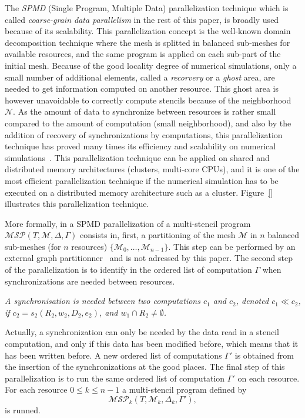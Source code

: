 The \textit{SPMD} (Single Program, Multiple Data) parallelization technique which is called \textit{coarse-grain data parallelism} in the rest of this paper, is broadly used because of its scalability. This parallelization concept is the well-known domain decomposition technique where the mesh is splitted in balanced sub-meshes for available resources, and the same program is applied on each sub-part of the initial mesh. Because of the good locality degree of numerical simulations, only a small number of additional elements, called a \textit{recorvery} or a \textit{ghost} area, are needed to get information computed on another resource. This ghost area is however unavoidable to correctly compute stencils because of the neighborhood $\mathcal{N}$. As the amount of data to synchronize between resources is rather small compared to the amount of computation (small neighborhood), and also by the addition of recovery of synchronizations by computations, this parallelization technique has proved many times its efficiency and scalability on numerical simulations~\cite{}. This parallelization technique can be applied on shared and distributed memory architectures (clusters, multi-core CPUs), and it is one of the most efficient parallelization technique if the numerical simulation has to be executed on a distributed memory architecture such as a cluster. Figure~\ref{} illustrates this parallelization technique.

More formally, in a SPMD parallelization of a multi-stencil program $\mathcal{MSP}(T,\mathcal{M},\Delta,\Gamma)$ consists in, first, a partitioning of the mesh $\mathcal{M}$ in $n$ balanced sub-meshes (for $n$ resources) $\{\mathcal{M}_0,\dots,\mathcal{M}_{n-1}\}$. This step can be performed by an external graph partitionner~\cite{} and is not adressed by this paper. The second step of the parallelization is to identify in the ordered list of computation $\Gamma$ when synchronizations are needed between resources.

\medskip
\begin{mydef}
\textit{A \textit{synchronisation} is needed between two computations $c_1$ and $c_2$, denoted $c_1 \ll c_2$, if $c_2=s_2(R_2,w_2,D_2,e_2)$, and $w_1 \cap R_2 \neq \emptyset$.}
\end{mydef}

Actually, a synchronization can only be needed by the data read in a stencil computation, and only if this data has been modified before, which means that it has been written before.
A new ordered list of computations $\Gamma'$ is obtained from the insertion of the synchronizations at the good places. The final step of this parallelization is to run the same ordered list of computation $\Gamma'$ on each resource. For each resource $0 \leq k \leq n-1$ a multi-stencil program defined by
\begin{equation}
\mathcal{MSP}_k(T,\mathcal{M}_k,\Delta_k,\Gamma'),
\end{equation}
is runned.

